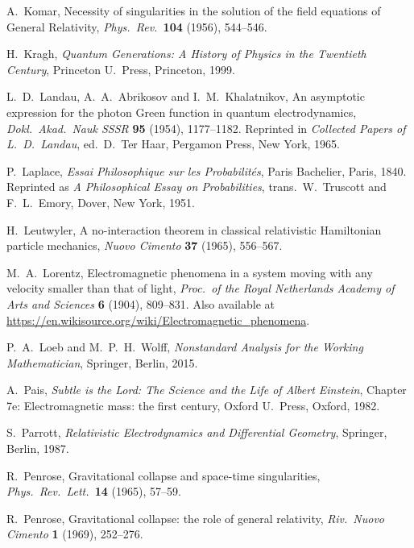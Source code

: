\documentclass[12pt]{article}
\begin{document}
\begin{thebibliography}{10}
 A.\ Komar, Necessity of singularities in the solution of the field equations of General Relativity, \textsl{Phys.\ Rev.\ }\textbf{104} (1956), 544--546.

 H.\ Kragh, \textsl{Quantum Generations: A History of Physics in the Twentieth Century}, Princeton U.\ Press, Princeton, 1999.
 
 L.\ D.\ Landau, A.\ A.\ Abrikosov and I.\ M.\ Khalatnikov, An asymptotic expression for the photon Green function in quantum electrodynamics, \textsl{Dokl.\ Akad.\ Nauk SSSR} \textbf{95} (1954), 1177--1182.  Reprinted in \textsl{Collected Papers of L.\ D.\ Landau}, ed.\ D.\ Ter Haar, Pergamon Press, New York, 1965.

 P.\ Laplace, \textsl{Essai Philosophique sur les Probabilit\'es},  Paris Bachelier, Paris, 1840.  Reprinted as \textsl{A Philosophical Essay on Probabilities}, trans.\ W.\ Truscott and F.\ L.\ Emory, Dover, New York, 1951.

  H.\ Leutwyler, A no-interaction theorem in classical relativistic Hamiltonian particle mechanics, \textsl{Nuovo Cimento} \textbf{37} (1965), 556--567.

 M.\ A.\ Lorentz, Electromagnetic phenomena in a system moving with any velocity smaller than that of light, \textsl{Proc.\ of the Royal Netherlands Academy of Arts and Sciences }{\bf 6} (1904), 809–831.  Also available at \href{https://en.wikisource.org/wiki/Electromagnetic_phenomena}{https://en.wikisource.org/wiki/Electromagnetic\_phenomena}.

  P.\ A.\ Loeb and M.\ P.\ H.\ Wolff, \textsl{Nonstandard Analysis for the Working Mathematician}, Springer, Berlin, 2015.

 A.\ Pais,  \textsl{Subtle is the Lord: The Science and the Life of Albert Einstein}, Chapter 7e: Electromagnetic mass: the first century, Oxford U.\ Press, Oxford, 1982.  

 S.\ Parrott, \textsl{Relativistic Electrodynamics and Differential Geometry}, Springer, Berlin, 1987.

 R.\ Penrose, Gravitational collapse and space-time singularities, \textsl{Phys.\ Rev.\ Lett.\ }\textbf{14} (1965), 57--59.

  R.\ Penrose, Gravitational collapse: the role of general relativity, \textsl{Riv.\ Nuovo Cimento} \textbf{1} (1969), 252--276.


\end{thebibliography}
\end{document}
